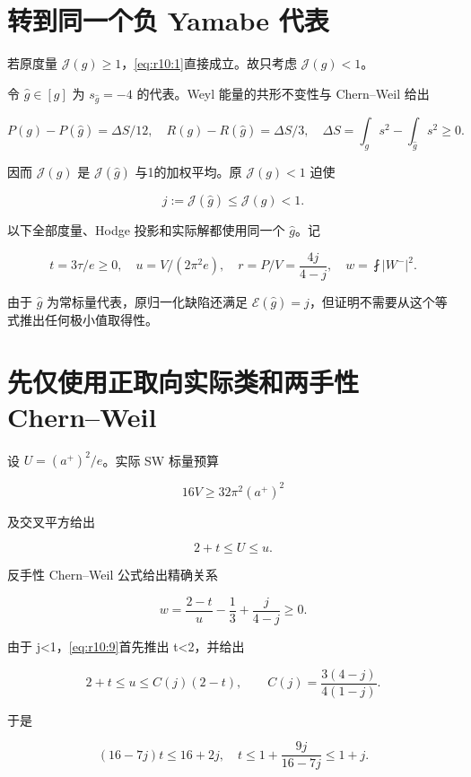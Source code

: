 \documentclass[UTF8,11pt,fontset=none]{ctexart}
\begin{document}
\section{转到同一个负 Yamabe 代表}\label{ch10:ux8f6cux5230ux540cux4e00ux4e2aux8d1f-yamabe-ux4ee3ux8868}

若原度量 \(\mathcal J(g)\ge1\)，\eqref{eq:r10:1}直接成立。故只考虑 \(\mathcal J(g)<1\)。

令 \(\hat g\in[g]\) 为 \(s_{\hat g}=-4\) 的代表。Weyl 能量的共形不变性与 Chern--Weil 给出

\[
P(g)-P(\hat g)=\Delta S/12,\quad
R(g)-R(\hat g)=\Delta S/3,
\quad\Delta S=\int_gs^2-\int_{\hat g}s^2\ge0.
\]

因而 \(\mathcal J(g)\) 是 \(\mathcal J(\hat g)\) 与1的加权平均。原 \(\mathcal J(g)<1\) 迫使

\[
j:=\mathcal J(\hat g)\le\mathcal J(g)<1.
\tag{10.6}\label{eq:r10:6}
\]

以下全部度量、Hodge 投影和实际解都使用同一个 \(\hat g\)。记

\[
t=3\tau/e\ge0,\quad u=V/(2\pi^2e),\quad
r=P/V=\frac{4j}{4-j},\quad
w=\fint|W^-|^2.
\tag{10.7}\label{eq:r10:7}
\]

由于 \(\hat g\) 为常标量代表，原归一化缺陷还满足 \(\mathcal E(\hat g)=j\)，但证明不需要从这个等式推出任何极小值取得性。

\section{先仅使用正取向实际类和两手性 Chern--Weil}\label{ch10:ux5148ux4ec5ux4f7fux7528ux6b63ux53d6ux5411ux5b9eux9645ux7c7bux548cux4e24ux624bux6027-chernweil}

设 \(U=(a^+)^2/e\)。实际 SW 标量预算

\[
16V\ge32\pi^2(a^+)^2
\]

及交叉平方给出

\[
2+t\le U\le u.
\tag{10.8}\label{eq:r10:8}
\]

反手性 Chern--Weil 公式给出精确关系

\[
\boxed{w=\frac{2-t}{u}-\frac13+\frac{j}{4-j}\ge0.}
\tag{10.9}\label{eq:r10:9}
\]

由于 j\textless1，\eqref{eq:r10:9}首先推出 t\textless2，并给出

\[
2+t\le u\le C(j)(2-t),\qquad
C(j)=\frac{3(4-j)}{4(1-j)}.
\tag{10.10}\label{eq:r10:10}
\]

于是

\[
(16-7j)t\le16+2j,
\quad
\boxed{t\le1+\frac{9j}{16-7j}\le1+j.}
\tag{10.11}\label{eq:r10:11}
\]
\end{document}
